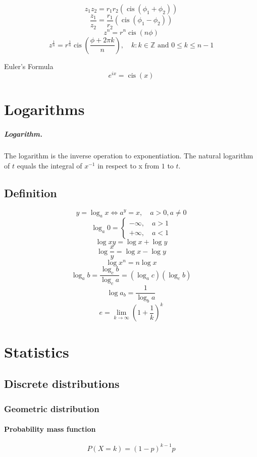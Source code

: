 \documentclass[12pt, oneside]{book}
\DeclareMathOperator\cis{cis}
\newcommand*\reciprocal[1]{\frac{1}{#1}}
\newcommand*\argument{\phi}
\newcommand*\integers{\mathbb{Z}}
\begin{document}
\[z_1 z_2 = r_1 r_2 \left ( \cis \left ( \phi_1 + \phi_2 \right ) \right )\]
\[\frac{z_1}{z_2} = \frac{r_1}{r_2} \left ( \cis \left ( \phi_1 - \phi_2 \right
) \right )\]
\[z^n = r^n \cis \left ( n \argument \right )\]
\[z^{\reciprocal{n}} = r^{\reciprocal{n}} \cis \left ( \frac{\argument + 2 \pi
k}{n} \right ), \quad
k : k \in \integers \text{ and } 0 \le k \le n - 1\]

Euler's Formula
\[e^{ix} = \cis \left ( x \right)\]

\chapter{Logarithms}

\paragraph{Logarithm.} The logarithm is the inverse operation to exponentiation.
The natural logarithm of \(t\) equals the integral of \(x^{-1}\) in respect to x
from \(1\) to \(t\).

\section{Definition}

\[y = \log_a x \iff a^y = x, \quad a > 0, a \ne 0\]
\[\log_a 0 = \begin{cases} -\infty, \quad a > 1 \\ +\infty, \quad a < 1
\end{cases}\]
\[\log x y = \log x + \log y\]
\[\log \frac{x}{y} = \log x - \log y\]
\[\log x^n = n \log x\]
\[\log_a b = \frac{\log_c b}{\log_c a} = \left ( \log_a c \right ) \left (
\log_c b \right )\]
\[\log a_b = \reciprocal{\log_b a}\]
\[e=\lim_{k\to\infty} \left ( 1 + \reciprocal{k} \right ) ^ k\]

\chapter{Statistics}

\section{Discrete distributions}

\subsection{Geometric distribution}
\subsubsection*{Probability mass function}
\[P(X = k) = (1 - p)^{k - 1}p\]
\end{document}
